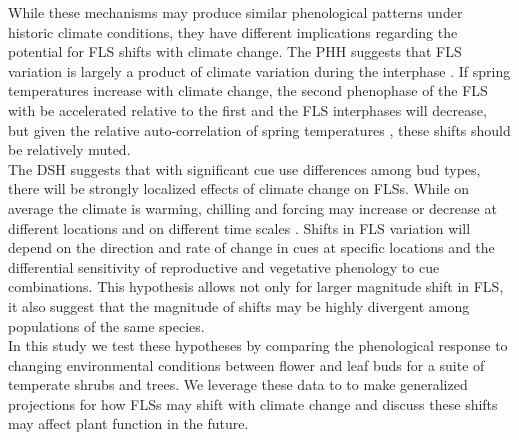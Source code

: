 \documentclass[11pt]{article}
\begin{document}
\noindent While these mechanisms may produce similar phenological patterns under historic climate conditions, they have different implications regarding the potential for FLS shifts with climate change. The PHH suggests that FLS variation is largely a product of climate variation during the interphase \citep{Mehlenbacher:1991aa}. If spring temperatures increase with climate change, the second phenophase of the FLS with be accelerated relative to the first and the FLS interphases will decrease, but given the relative auto-correlation of spring temperatures \citep{}, these shifts should be relatively muted. \\

\noindent The DSH suggests that with significant cue use differences among bud types, there will be strongly localized effects of climate change on FLSs. While on average the climate is warming, chilling and forcing may increase or decrease at different locations and on different time scales \citep{Ettinger}. Shifts in FLS variation will depend on the direction and rate of change in cues at specific locations and the differential sensitivity of reproductive and vegetative phenology to cue combinations. This hypothesis allows not only for larger magnitude shift in FLS, it also suggest that the magnitude of shifts may be highly divergent among populations of the same species.\\


\noindent In this study we test these hypotheses by comparing the phenological response to changing environmental conditions between flower and leaf buds for a suite of temperate shrubs and trees. We leverage these data to to make generalized projections for how FLSs may shift with climate change and discuss these shifts may affect plant function in the future.\\ 
\end{document}
